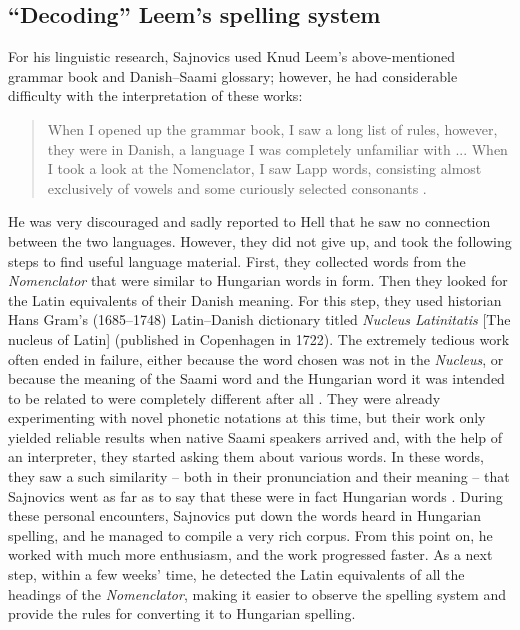 \documentclass[output=paper,colorlinks,citecolor=brown,arabicfont,chinesefont]{langscibook}
\begin{document}
\subsection{“Decoding” Leem’s spelling system}

For his linguistic research, Sajnovics used Knud Leem’s above-mentioned grammar book and Danish–Saami glossary; however, he had considerable difficulty with the interpretation of these works:

\begin{quote}
    When I opened up the grammar book, I saw a long list of rules, however, they were in Danish, a language I was completely unfamiliar with ... When I took a look at the Nomenclator, I saw Lapp words, consisting almost exclusively of vowels and some curiously selected consonants \citep[36]{Sajnovics1994}.
\end{quote}

He was very discouraged and sadly reported to Hell that he saw no connection between the two languages. However, they did not give up, and took the following steps to find useful language material. First, they collected words from the \textit{Nomenclator} that were similar to Hungarian words in form. Then they looked for the Latin equivalents of their Danish meaning. For this step, they used historian Hans Gram’s (1685--1748) Latin–Danish dictionary titled \emph{Nucleus Latinitatis} [The nucleus of Latin] (published in Copenhagen in 1722). The extremely tedious work often ended in failure, either because the word chosen was not in the \textit{Nucleus}, or because the meaning of the Saami word and the Hungarian word it was intended to be related to were completely different after all \citep[36]{Sajnovics1994}. They were already experimenting with novel phonetic notations at this time, but their work only yielded reliable results when native Saami speakers arrived and, with the help of an interpreter, they started asking them about various words. In these words, they saw a such similarity – both in their pronunciation and their meaning – that Sajnovics went as far as to say that these were in fact Hungarian words \citep[37]{Sajnovics1994}. During these personal encounters, Sajnovics put down the words heard in Hungarian spelling, and he managed to compile a very rich corpus. From this point on, he worked with much more enthusiasm, and the work progressed faster. As a next step, within a few weeks’ time, he detected the Latin equivalents of all the headings of the \textit{Nomenclator}, making it easier to observe the spelling system and provide the rules for converting it to Hungarian spelling.
\end{document}
